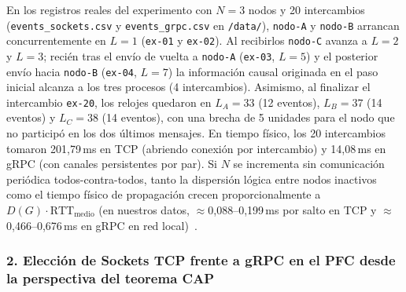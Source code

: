 \documentclass[12pt,a4paper]{article}
\begin{document}
En los registros reales del experimento con $N = 3$ nodos y 20 intercambios (\texttt{events\_sockets.csv} y \texttt{events\_grpc.csv} en \texttt{/data/}), \texttt{nodo-A} y \texttt{nodo-B} arrancan concurrentemente en $L = 1$ (\texttt{ex-01} y \texttt{ex-02}). Al recibirlos \texttt{nodo-C} avanza a $L = 2$ y $L = 3$; recién tras el envío de vuelta a \texttt{nodo-A} (\texttt{ex-03}, $L = 5$) y el posterior envío hacia \texttt{nodo-B} (\texttt{ex-04}, $L = 7$) la información causal originada en el paso inicial alcanza a los tres procesos (4 intercambios). Asimismo, al finalizar el intercambio \texttt{ex-20}, los relojes quedaron en $L_A = 33$ (12 eventos), $L_B = 37$ (14 eventos) y $L_C = 38$ (14 eventos), con una brecha de 5 unidades para el nodo que no participó en los dos últimos mensajes. En tiempo físico, los 20 intercambios tomaron 201,79\,ms en TCP (abriendo conexión por intercambio) y 14,08\,ms en gRPC (con canales persistentes por par). Si $N$ se incrementa sin comunicación periódica todos-contra-todos, tanto la dispersión lógica entre nodos inactivos como el tiempo físico de propagación crecen proporcionalmente a $D(G) \cdot \mathrm{RTT}_{\mathrm{medio}}$ (en nuestros datos, $\approx$0,088--0,199\,ms por salto en TCP y $\approx$0,466--0,676\,ms en gRPC en red local)~\cite{castello2024inductive,mathur2022treeclock}.

\subsubsection{2. Elección de Sockets TCP frente a gRPC en el PFC desde la perspectiva del teorema CAP}
\end{document}
